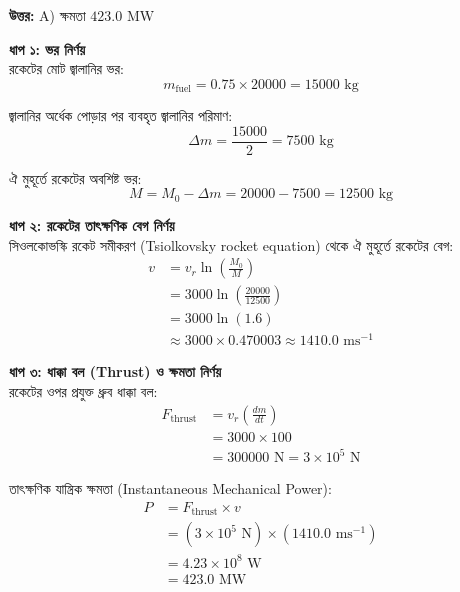 \documentclass[12pt, a4paper]{article}
\begin{document}
\vspace{0.5em}
\begin{tcolorbox}[answerbox]
    \textbf{\color{success} উত্তর:} A) ক্ষমতা $423.0\text{ MW}$
\end{tcolorbox}
\vspace{1em}

\begin{tcolorbox}[solutionbox={সমাধান (Solution)}]
    \noindent
    \textbf{ধাপ ১: ভর নির্ণয়} \\
    রকেটের মোট জ্বালানির ভর:
    \[ m_{\text{fuel}} = 0.75 \times 20000 = 15000\text{ kg} \]
    
    জ্বালানির অর্ধেক পোড়ার পর ব্যবহৃত জ্বালানির পরিমাণ:
    \[ \Delta m = \frac{15000}{2} = 7500\text{ kg} \]
    
    ঐ মুহূর্তে রকেটের অবশিষ্ট ভর:
    \[ M = M_0 - \Delta m = 20000 - 7500 = 12500\text{ kg} \]
    
    \vspace{0.5em}
    \noindent\textbf{ধাপ ২: রকেটের তাৎক্ষণিক বেগ নির্ণয়} \\
    সিওলকোভস্কি রকেট সমীকরণ (Tsiolkovsky rocket equation) থেকে ঐ মুহূর্তে রকেটের বেগ:
    \begin{align*}
        v &= v_r \ln\left(\frac{M_0}{M}\right) \\
          &= 3000 \ln\left(\frac{20000}{12500}\right) \\
          &= 3000 \ln(1.6) \\
          &\approx 3000 \times 0.470003 \approx 1410.0\text{ ms}^{-1}
    \end{align*}
    
    \vspace{0.5em}
    \noindent\textbf{ধাপ ৩: ধাক্কা বল (Thrust) ও ক্ষমতা নির্ণয়} \\
    রকেটের ওপর প্রযুক্ত ধ্রুব ধাক্কা বল:
    \begin{align*}
        F_{\text{thrust}} &= v_r \left(\frac{dm}{dt}\right) \\
                          &= 3000 \times 100 \\
                          &= 300000\text{ N} = 3 \times 10^5\text{ N}
    \end{align*}
    
    তাৎক্ষণিক যান্ত্রিক ক্ষমতা (Instantaneous Mechanical Power):
    \begin{align*}
        P &= F_{\text{thrust}} \times v \\
          &= (3 \times 10^5\text{ N}) \times (1410.0\text{ ms}^{-1}) \\
          &= 4.23 \times 10^8\text{ W} \\
          &= \mathbf{423.0}\text{ MW}
    \end{align*}
\end{tcolorbox}
\end{document}
